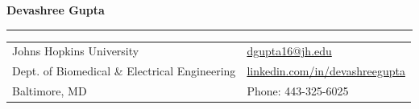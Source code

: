 \documentclass[letterpaper,11pt,oneside]{article}
\begin{document}
\noindent \LARGE{\textbf{Devashree Gupta}} \\
\vspace{-2ex}
\hrule
\normalsize

\begin{center}
\begin{tabular}{l l}
 Johns Hopkins University & \hspace{1in} \href{mailto:dgupta16@jh.edu}{dgupta16@jh.edu} \\
 Dept. of Biomedical \& Electrical Engineering & \hspace{1in} \href{https://linkedin.com/in/devashreegupta}{linkedin.com/in/devashreegupta} \\
 Baltimore, MD & \hspace{1in} Phone: 443-325-6025 \\
\end{tabular}
\end{center}

\vspace{1em}
\end{document}
